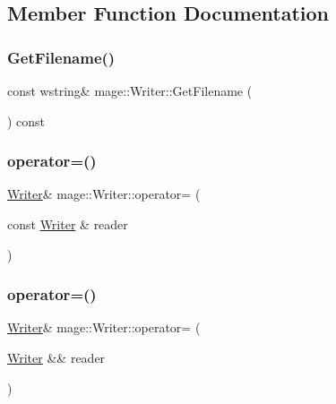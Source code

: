 \subsection{Member Function Documentation}
\hypertarget{classmage_1_1_writer_aa874f2ee6cdd6663078d213f10d984f1}{}\label{classmage_1_1_writer_aa874f2ee6cdd6663078d213f10d984f1} 
\subsubsection{\texorpdfstring{Get\+Filename()}{GetFilename()}}
{\footnotesize\ttfamily const wstring\& mage\+::\+Writer\+::\+Get\+Filename (\begin{DoxyParamCaption}{ }\end{DoxyParamCaption}) const}

\hypertarget{classmage_1_1_writer_a14fff6d050ad263bd351b26b86ca4186}{}\label{classmage_1_1_writer_a14fff6d050ad263bd351b26b86ca4186} 
\subsubsection{\texorpdfstring{operator=()}{operator=()}\hspace{0.1cm}{\footnotesize\ttfamily [1/2]}}
{\footnotesize\ttfamily \hyperlink{classmage_1_1_writer}{Writer}\& mage\+::\+Writer\+::operator= (\begin{DoxyParamCaption}\item[{const \hyperlink{classmage_1_1_writer}{Writer} \&}]{reader }\end{DoxyParamCaption})\hspace{0.3cm}{\ttfamily [delete]}}

\hypertarget{classmage_1_1_writer_aacbdb763abf79c5753b89bd336f56ea3}{}\label{classmage_1_1_writer_aacbdb763abf79c5753b89bd336f56ea3} 
\subsubsection{\texorpdfstring{operator=()}{operator=()}\hspace{0.1cm}{\footnotesize\ttfamily [2/2]}}
{\footnotesize\ttfamily \hyperlink{classmage_1_1_writer}{Writer}\& mage\+::\+Writer\+::operator= (\begin{DoxyParamCaption}\item[{\hyperlink{classmage_1_1_writer}{Writer} \&\&}]{reader }\end{DoxyParamCaption})\hspace{0.3cm}{\ttfamily [delete]}}

